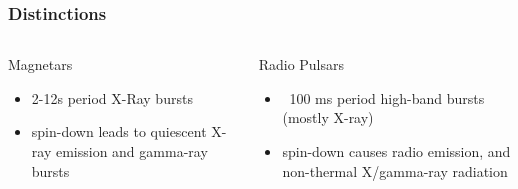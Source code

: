 \documentclass[hyperref=pdftex, presentation]{beamer}
\begin{document}
\begin{frame}{}
\frametitle{\Large Distinctions}
\begin{columns}[c] %

\begin{block}{Magnetars}
\begin{itemize}
 \item<2-> 2-12s period X-Ray bursts%
 \item<4-> spin-down leads to quiescent X-ray emission and gamma-ray bursts
\end{itemize}
\end{block}
\begin{block}{Radio Pulsars}
\begin{itemize}
	\item<3-> ~100 ms period high-band bursts (mostly X-ray)
	\item<5-> spin-down causes radio emission, and non-thermal X/gamma-ray radiation
\end{itemize}
\end{block}


\end{columns}
\end{frame}







\end{document}
